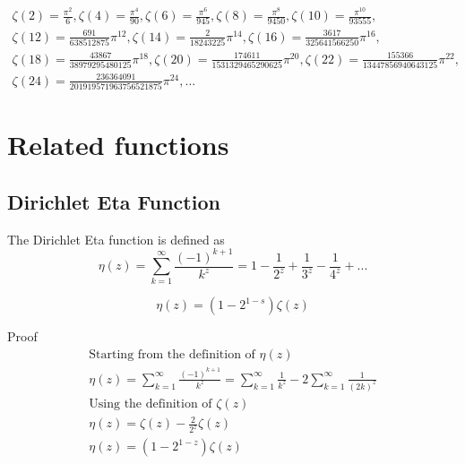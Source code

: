 \documentclass[a4paper]{article}
\begin{document}
\begin{gather*}
\zeta(2) = \frac{\pi^2}{6}, 
\zeta(4) = \frac{\pi^4}{90},
\zeta(6) = \frac{\pi^6}{945},
\zeta(8) = \frac{\pi^8}{9450},
\zeta(10) = \frac{\pi^{10}}{93555},
\\
\zeta(12) = \frac{691}{638512875} \pi^{12},
\zeta(14) = \frac{2}{18243225} \pi^{14},
\zeta(16) = \frac{3617}{325641566250} \pi^{16},
\\
\zeta(18) = \frac{43867}{38979295480125} \pi^{18},
\zeta(20) = \frac{174611}{1531329465290625} \pi^{20},
\zeta(22) = \frac{155366}{13447856940643125} \pi^{22},
\\
\zeta(24) = \frac{236364091}{201919571963756521875} \pi^{24},
...
\end{gather*}

\pagebreak

\section{Related functions}

\subsection{Dirichlet Eta Function}

\begin{definition}\label{Dirichlet Eta Function def}
The Dirichlet Eta function is defined as 
$$
\eta(z) = \sum_{k=1}^{\infty} \frac{(-1)^{k+1}}{k^z} = 1 - \frac{1}{2^z} +  \frac{1}{3^z} -  \frac{1}{4^z} + ...
$$
\end{definition}

\begin{theorem}
\begin{equation}
\boxed{
\eta(z) = (1 - 2^{1-s}) \zeta(z)
}
\end{equation}

Proof
\\
\begin{gather*}
\text{Starting from the definition of $\eta(z)$}
\\
\eta(z) 
=
\sum_{k=1}^{\infty} \frac{(-1)^{k+1}}{k^z}
=
\sum_{k=1}^{\infty} \frac{1}{k^z} - 2 \sum_{k=1}^{\infty} \frac{1}{(2k)^z}
\\
\text{Using the definition of $\zeta(z)$}
\\
\eta(z) 
=
\zeta(z) - \frac{2}{2^{z}} \zeta(z)
\\
\eta(z) = (1 - 2^{1-z}) \zeta(z)
\end{gather*}
\end{theorem}
\end{document}
